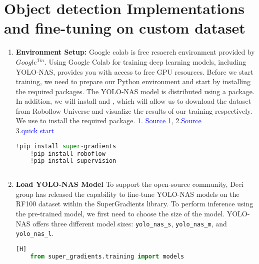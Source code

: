 \section{Object detection Implementations and fine-tuning on custom dataset}

\begin{enumerate}
    \item \textbf{Environment Setup: } Google colab is free resaerch environment provided by $Google^{Tm}$. Using Google Colab for training deep learning models, including YOLO-NAS, provides you with access to free GPU resources. Before we start training, we need to prepare our Python environment and start by installing the required packages.
    The YOLO-NAS model is distributed using a \boxed{\textcolor{black}{super-gradients}}  package. In addition, we will install  and , which will allow us to download the dataset from Roboflow Universe and visualize the results of our training respectively. We use  to install the required package. 1. \href{https://deci.ai/blog/how-to-train-yolo-nas-with-supergradients-a-step-by-step-guide/}{\textcolor{blue}{Source 1}},
2.\href{https://blog.roboflow.com/yolo-nas-how-to-train-on-custom-dataset/#what-is-yolo-nas}{\textcolor{blue}{Source}} \\

3.\href{https://docs.deci.ai/super-gradients/latest/YOLONAS.html#quickstart}{\textcolor{blue}{quick start}}\\
    
    \begin{lstlisting}[language=Python, caption=Installing the required package]
    !pip install super-gradients
    !pip install roboflow
    !pip install supervision
        
    \end{lstlisting}
    \item \textbf{Load YOLO-NAS Model}
    To support the open-source community, Deci group has released the capability to fine-tune YOLO-NAS models on the RF100 dataset within the SuperGradients library. To perform inference using the pre-trained model, we first need to choose the size of the model. YOLO-NAS offers three different model sizes: \verb|yolo_nas_s|, \verb|yolo_nas_m|, and \verb|yolo_nas_l|.
    \begin{lstlisting}[language=Python, caption=importing models from the supergradients][H]
    from super_gradients.training import models


\end{lstlisting}
\end{enumerate}
